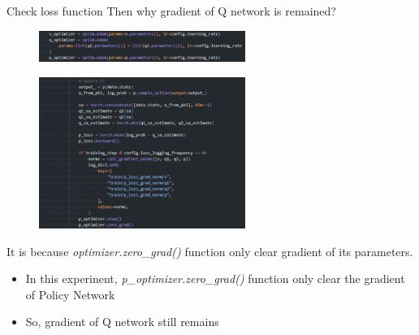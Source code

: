 \documentclass[8pt]{beamer}
\newcommand{\ti}[1]{\textit{#1}}
\begin{document}
\begin{frame}{Check loss function}
    Then why gradient of Q network is remained?
    \begin{figure}
        \includegraphics[width=0.6\textwidth]{POptimizerMistake1.png}
    \end{figure}
    \begin{figure}
        \includegraphics[width=0.6\textwidth]{POptimizerMistake2.png}
    \end{figure}

    It is because \ti{optimizer.zero\_grad()} function only clear gradient of its parameters.
    \begin{itemize}
        \item In this experinent, \ti{p\_optimizer.zero\_grad()} function only clear the gradient of Policy Network
        \item So, gradient of Q network still remains
    \end{itemize}
\end{frame}
\end{document}
